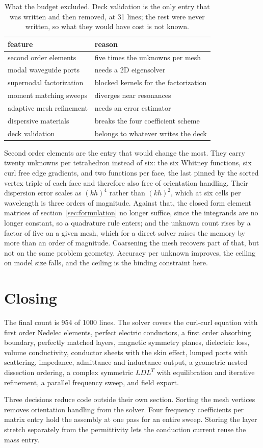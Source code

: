 \documentclass[11pt]{article}
\begin{document}
\begin{table}[H]
\centering
\begin{tabular}{ll}
\toprule
feature & reason \\
\midrule
second order elements & five times the unknowns per mesh \\
modal waveguide ports & needs a 2D eigensolver \\
supernodal factorization & blocked kernels for the factorization \\
moment matching sweeps & diverges near resonances \\
adaptive mesh refinement & needs an error estimator \\
dispersive materials & breaks the four coefficient scheme \\
deck validation & belongs to whatever writes the deck \\
\bottomrule
\end{tabular}
\caption{What the budget excluded. Deck validation is the only entry that was
written and then removed, at 31 lines; the rest were never written, so what they
would have cost is not known.}
\end{table}

Second order elements are the entry that would change the most. They carry
twenty unknowns per tetrahedron instead of six: the
six Whitney functions, six curl free edge gradients, and two functions per
face, the last pinned by the sorted vertex triple of each face and therefore
also free of orientation handling. Their dispersion error scales as
\((kh)^{4}\) rather than \((kh)^{2}\), which at six cells per wavelength
is three orders of magnitude. Against that, the closed form element matrices
of section~\ref{sec:formulation} no longer suffice, since the integrands are
no longer constant, so a quadrature rule enters; and the unknown count rises
by a factor of five on a given mesh, which for a direct solver raises the
memory by more than an order of magnitude. Coarsening the mesh recovers part
of that, but not on the same problem geometry. Accuracy per unknown improves, the ceiling on model
size falls, and the ceiling is the binding constraint here.

\section{Closing}

The final count is 954 of 1000 lines. The solver covers the curl-curl
equation with first order Nedelec elements, perfect electric conductors, a
first order absorbing boundary, perfectly matched layers, magnetic symmetry
planes, dielectric loss, volume conductivity, conductor sheets with the skin
effect, lumped ports with scattering, impedance, admittance and inductance
output, a geometric nested dissection ordering, a complex symmetric
\(LDL^T\) with equilibration and iterative refinement, a parallel frequency
sweep, and field export.

Three decisions reduce code outside their own section. Sorting the mesh vertices
removes orientation handling from the solver. Four frequency coefficients
per matrix entry hold the assembly at one pass for an entire sweep. Storing
the layer stretch separately from the permittivity lets the conduction
current reuse the mass entry.
\end{document}
